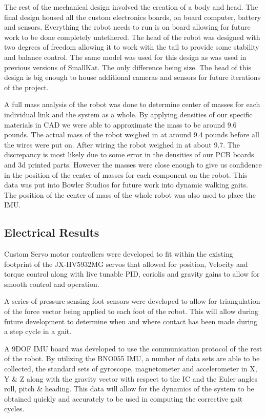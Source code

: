 The rest of the mechanical design involved the creation of a body and head. The final design housed all the custom electronics boards, on board computer, battery and sensors. Everything the robot needs to run is on board allowing for future work to be done completely untethered. The head of the robot was designed with two degrees of freedom allowing it to work with the tail to provide some stability and balance control. The same model was used for this design as was used in previous versions of SmallKat. The only difference being size. The head of this design is big enough to house additional cameras and sensors for future iterations of the project.

A full mass analysis of the robot was done to determine center of masses for each individual link and the system as a whole. By applying densities of our specific materials in CAD we were able to approximate the mass to be around 9.6 pounds. The actual mass of the robot weighed in at around 9.4 pounds before all the wires were put on. After wiring the robot weighed in at about 9.7. The discrepancy is most likely due to some error in the densities of our PCB boards and 3d printed parts. However the masses were close enough to give us confidence in the position of the center of masses for each component on the robot. This data was put into Bowler Studios for future work into dynamic walking gaits. The position of the center of mass of the whole robot was also used to place the IMU.



\subsection{Electrical Results}
Custom Servo motor controllers were developed to fit within the existing footprint of the JX-HV5932MG servos that allowed for position, Velocity and torque control along with live tunable PID, coriolis and gravity gains to allow for smooth control and operation. 

A series of pressure sensing foot sensors were developed to allow for triangulation of the force vector being applied to each foot of the robot. This will allow during future development to determine when and where contact has been made during a step cycle in a gait.

A 9DOF IMU board was developed to use the communication protocol of the rest of the robot. By utilizing the BNO055 IMU, a number of data sets are able to be collected, the standard sets of gyroscope, magnetometer and accelerometer in X, Y \& Z along with the gravity vector with respect to the IC and the Euler angles roll, pitch \& heading. This data will allow for the dynamics of the system to be obtained quickly and accurately to be used in computing the corrective gait cycles.

